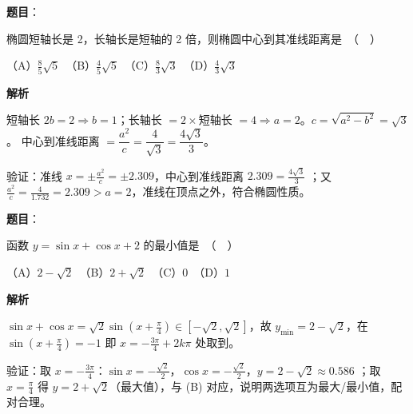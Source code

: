 \begin{answer}

\textbf{题目}：

椭圆短轴长是 2，长轴长是短轴的 2 倍，则椭圆中心到其准线距离是　（　）

（A）$\frac{8}{5}\sqrt{5}$　（B）$\frac{4}{5}\sqrt{5}$　（C）$\frac{8}{3}\sqrt{3}$　（D）$\frac{4}{3}\sqrt{3}$

\textbf{解析}

短轴长 $2b=2\Rightarrow b=1$；长轴长 $=2\times$短轴长 $=4\Rightarrow a=2$。$c=\sqrt{a^2-b^2}=\sqrt3$。
中心到准线距离 $=\dfrac{a^2}{c}=\dfrac{4}{\sqrt3}=\dfrac{4\sqrt3}{3}$。

验证：准线 $x=\pm\frac{a^2}{c}=\pm2.309$，中心到准线距离 $2.309=\frac{4\sqrt3}{3}$ ；又 $\frac{a^2}{c}=\frac{4}{1.732}=2.309>a=2$，准线在顶点之外，符合椭圆性质。


\end{answer}
\begin{answer}

\textbf{题目}：

函数 $y = \sin x + \cos x + 2$ 的最小值是　（　）

（A）$2 - \sqrt{2}$　（B）$2 + \sqrt{2}$　（C）$0$　（D）$1$

\textbf{解析}

$\sin x+\cos x=\sqrt2\sin\!\left(x+\frac\pi4\right)\in[-\sqrt2,\sqrt2]$，故 $y_{\min}=2-\sqrt2$，在 $\sin(x+\frac\pi4)=-1$ 即 $x=-\frac{3\pi}{4}+2k\pi$ 处取到。

验证：取 $x=-\frac{3\pi}{4}$：$\sin x=-\frac{\sqrt2}{2}$，$\cos x=-\frac{\sqrt2}{2}$，$y=2-\sqrt2\approx0.586$ ；取 $x=\frac{\pi}{4}$ 得 $y=2+\sqrt2$（最大值），与 (B) 对应，说明两选项互为最大/最小值，配对合理。


\end{answer}
